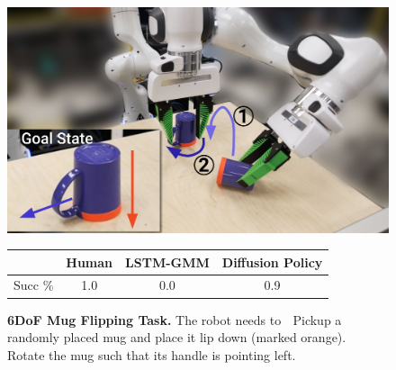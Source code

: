 \documentclass[Afour,sageh,times]{sagej}
\begin{document}
\begin{figure}[t]
\centering
\includegraphics[width=0.9\linewidth]{figure/mug_task.pdf}

\vspace{1.5mm}
\begin{tabular}{c|c|c|c}
\toprule
        & Human & LSTM-GMM & Diffusion Policy \\
\midrule
Succ \% & 1.0   & 0.0      & 0.9             \\
\bottomrule
\end{tabular}
\caption{
\textbf{6DoF Mug Flipping Task.} 
\label{fig:mug_task}
The robot needs to 
\textcircled{} Pickup a randomly placed mug and place it lip down (marked orange).
\textcircled{} Rotate the mug such that its handle is pointing left.
}

\vspace{-4mm}
\end{figure}
\end{document}
